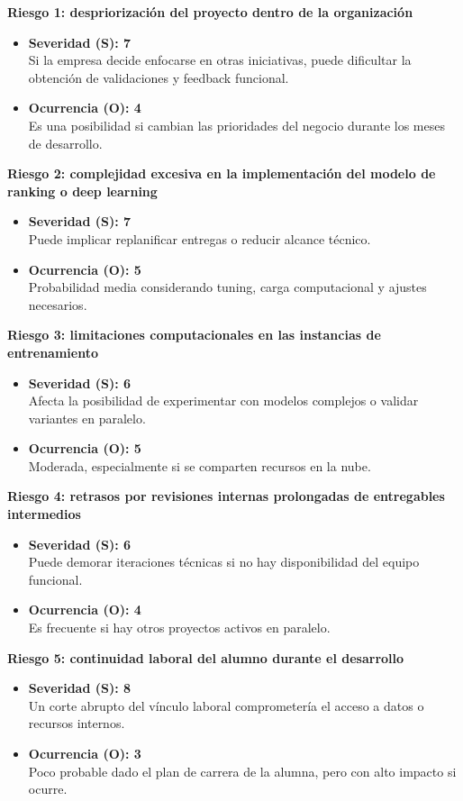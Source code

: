 \documentclass[
11pt, %
]{charter}
\begin{document}
\textbf{Riesgo 1: despriorización del proyecto dentro de la organización}
\begin{itemize}
  \item \textbf{Severidad (S): 7} \\
  Si la empresa decide enfocarse en otras iniciativas, puede dificultar la obtención de validaciones y feedback funcional.
  \item \textbf{Ocurrencia (O): 4} \\
  Es una posibilidad si cambian las prioridades del negocio durante los meses de desarrollo.
\end{itemize}

\textbf{Riesgo 2: complejidad excesiva en la implementación del modelo de ranking o deep learning}
\begin{itemize}
  \item \textbf{Severidad (S): 7} \\
  Puede implicar replanificar entregas o reducir alcance técnico.
  \item \textbf{Ocurrencia (O): 5} \\
  Probabilidad media considerando tuning, carga computacional y ajustes necesarios.
\end{itemize}

\textbf{Riesgo 3: limitaciones computacionales en las instancias de entrenamiento}
\begin{itemize}
  \item \textbf{Severidad (S): 6} \\
  Afecta la posibilidad de experimentar con modelos complejos o validar variantes en paralelo.
  \item \textbf{Ocurrencia (O): 5} \\
  Moderada, especialmente si se comparten recursos en la nube.
\end{itemize}

\textbf{Riesgo 4: retrasos por revisiones internas prolongadas de entregables intermedios}
\begin{itemize}
  \item \textbf{Severidad (S): 6} \\
  Puede demorar iteraciones técnicas si no hay disponibilidad del equipo funcional.
  \item \textbf{Ocurrencia (O): 4} \\
  Es frecuente si hay otros proyectos activos en paralelo.
\end{itemize}

\textbf{Riesgo 5: continuidad laboral del alumno durante el desarrollo}
\begin{itemize}
  \item \textbf{Severidad (S): 8} \\
  Un corte abrupto del vínculo laboral comprometería el acceso a datos o recursos internos.
  \item \textbf{Ocurrencia (O): 3} \\
  Poco probable dado el plan de carrera de la alumna, pero con alto impacto si ocurre.
\end{itemize}
\end{document}
